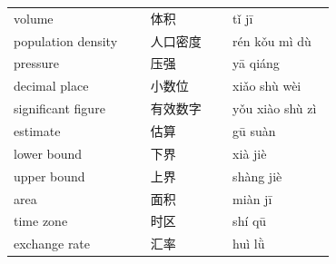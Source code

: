 \documentclass[11pt]{article}
\begin{document}
\begin{longtable}{@{}p{0.40\linewidth}p{0.24\linewidth}p{0.30\linewidth}@{}}
volume & 体积 & tǐ jī \\
population density & 人口密度 & rén kǒu mì dù \\
pressure & 压强 & yā qiáng \\
decimal place & 小数位 & xiǎo shù wèi \\
significant figure & 有效数字 & yǒu xiào shù zì \\
estimate & 估算 & gū suàn \\
lower bound & 下界 & xià jiè \\
upper bound & 上界 & shàng jiè \\
area & 面积 & miàn jī \\
time zone & 时区 & shí qū \\
exchange rate & 汇率 & huì lǜ \\
\end{longtable}
\end{document}
